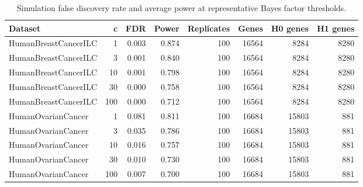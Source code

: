 \begin{table}[htbp]
\centering
\caption{Simulation false discovery rate and average power at representative Bayes factor thresholds.}
\label{tab:simulation-thresholds}
\begin{tabular}{lrrrrrrr}
\toprule
Dataset & c & FDR & Power & Replicates & Genes & H0 genes & H1 genes
 \\
\midrule
HumanBreastCancerILC & 1 & 0.003 & 0.874 & 100 & 16564 & 8284 & 8280
 \\
HumanBreastCancerILC & 3 & 0.001 & 0.840 & 100 & 16564 & 8284 & 8280
 \\
HumanBreastCancerILC & 10 & 0.001 & 0.798 & 100 & 16564 & 8284 & 8280
 \\
HumanBreastCancerILC & 30 & 0.000 & 0.758 & 100 & 16564 & 8284 & 8280
 \\
HumanBreastCancerILC & 100 & 0.000 & 0.712 & 100 & 16564 & 8284 & 8280
 \\
HumanOvarianCancer & 1 & 0.081 & 0.811 & 100 & 16684 & 15803 & 881
 \\
HumanOvarianCancer & 3 & 0.035 & 0.786 & 100 & 16684 & 15803 & 881
 \\
HumanOvarianCancer & 10 & 0.016 & 0.757 & 100 & 16684 & 15803 & 881
 \\
HumanOvarianCancer & 30 & 0.010 & 0.730 & 100 & 16684 & 15803 & 881
 \\
HumanOvarianCancer & 100 & 0.007 & 0.700 & 100 & 16684 & 15803 & 881
 \\
\bottomrule
\end{tabular}
\end{table}
